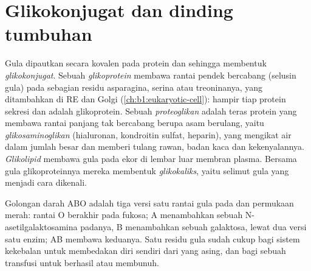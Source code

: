 \section{Glikokonjugat dan dinding tumbuhan}

\begin{definition}\label{def:b1:carbohydrates:glycoconjugate}
Gula dipautkan secara kovalen pada protein dan  sehingga membentuk
\emph{glikokonjugat}. Sebuah
\emph{glikoprotein} membawa rantai pendek bercabang
(selusin gula) pada sebagian residu asparagina, serina atau treoninanya,
yang ditambahkan di RE dan Golgi (\cref{ch:b1:eukaryotic-cell}): hampir
tiap protein sekresi dan  adalah glikoprotein. Sebuah
\emph{proteoglikan} adalah teras protein yang
membawa rantai panjang tak bercabang berupa  asam berulang,
yaitu \emph{glikosaminoglikan} (hialuronan,
kondroitin sulfat, heparin), yang mengikat air dalam jumlah besar dan
memberi tulang rawan, badan kaca dan  kekenyalannya.
\emph{Glikolipid} membawa gula pada ekor  di
lembar luar membran plasma. Bersama gula glikoproteinnya mereka
membentuk \emph{glikokaliks}, yaitu selimut gula
yang menjadi cara  dikenali.
\end{definition}

\begin{example}\label{ex:b1:carbohydrates:abo}
Golongan darah ABO adalah tiga versi satu rantai gula pada 
dan  permukaan  merah: rantai O berakhir pada fukosa; A
menambahkan sebuah N-asetilgalaktosamina padanya, B menambahkan sebuah
galaktosa, lewat dua versi satu enzim;  AB membawa keduanya. Satu
residu gula sudah cukup bagi sistem kekebalan untuk membedakan diri
sendiri dari yang asing, dan bagi sebuah transfusi untuk berhasil atau
membunuh.
\end{example}

